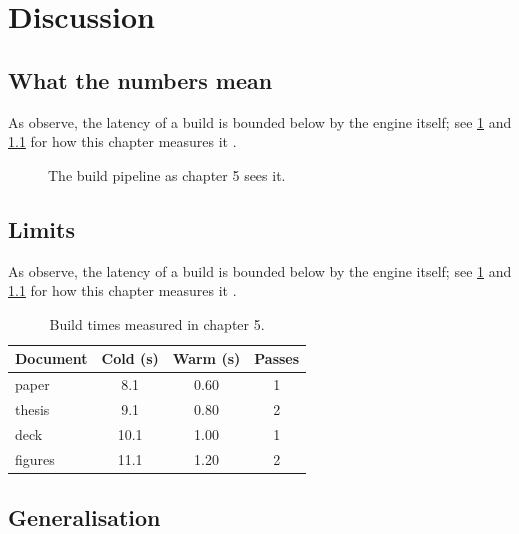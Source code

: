 \chapter{Discussion}\label{ch:discussion}

\section{What the numbers mean}\label{sec:discussion-0}
\lipsum[89-102]

As \textcite{tectonic2024} observe, the latency \latency{} of a build is
bounded below by the engine itself; see \cref{ch:discussion} and \cref{fig:discussion}
for how this chapter measures it \parencite{kleppmann2019}.

\begin{figure}[t]
  \centering
  \caption{The build pipeline as chapter 5 sees it.}\label{fig:discussion}
\end{figure}

\section{Limits}\label{sec:discussion-1}
\lipsum[103-116]

As \textcite{kleppmann2019} observe, the latency \latency{} of a build is
bounded below by the engine itself; see \cref{ch:discussion} and \cref{fig:discussion}
for how this chapter measures it \parencite{lamport1994}.

\begin{table}[t]
  \centering
  \begin{tabular}{lSSS}
    \toprule
    Document & {Cold (s)} & {Warm (s)} & {Passes} \\
    \midrule
    paper & 8.1 & 0.60 & 1 \\
    thesis & 9.1 & 0.80 & 2 \\
    deck & 10.1 & 1.00 & 1 \\
    figures & 11.1 & 1.20 & 2 \\
    \bottomrule
  \end{tabular}
  \caption{Build times measured in chapter 5.}\label{tab:discussion}
\end{table}

\section{Generalisation}\label{sec:discussion-2}
\lipsum[117-130]


